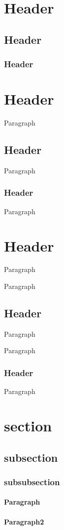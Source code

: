 \section{Header}
\subsection{Header}
\subsubsection{Header}
\hrulefill
\section{Header}
Paragraph

\subsection{Header}
Paragraph

\subsubsection{Header}
Paragraph

\hrulefillParagraph

\section{Header}
Paragraph

Paragraph

\subsection{Header}
Paragraph

Paragraph

\subsubsection{Header}
Paragraph

\section{section}
\subsection{subsection}
\subsubsection{subsubsection}
\paragraph{Paragraph}
\paragraph{Paragraph2}
